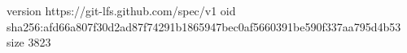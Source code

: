 version https://git-lfs.github.com/spec/v1
oid sha256:afd66a807f30d2ad87f74291b1865947bec0af5660391be590f337aa795d4b53
size 3823
